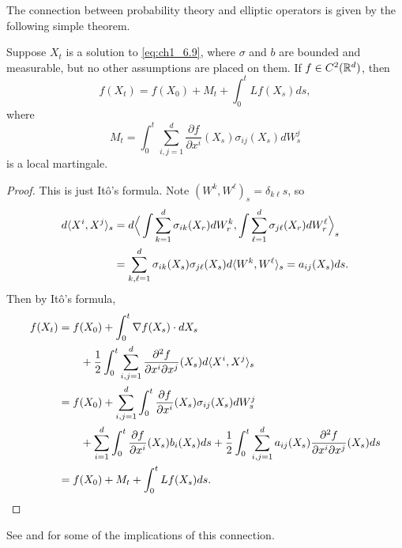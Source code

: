 The connection between probability theory and elliptic operators is given by the following simple theorem.

\begin{theorem}\label{thm:ch1_6.3}
Suppose $X_t$ is a solution to \eqref{eq:ch1_6.9}, where $\sigma$ and $b$ are bounded and measurable, but no other assumptions are placed on them. If $f \in C^2(\mathbb{R}^d)$, then
\begin{equation}\label{eq:ch1_6.11}
    f(X_t) = f(X_0) + M_t + \int_0^t Lf(X_s)ds,
\end{equation}
where
\begin{equation}\label{eq:ch1_6.12}
    M_t = \int_0^t \sum_{i,j=1}^d \frac{\partial f}{\partial x^i}(X_s)\sigma_{ij}(X_s)dW_s^j
\end{equation}
is a local martingale.
\end{theorem}

\begin{proof}
This is just It\^o's formula. Note $(W^k,W^\ell)_s = \delta_{k\ell}s$, so
\begin{align*}
    d\langle X^i,X^j \rangle_s &= d\Big\langle \int \sum_{k=1}^d \sigma_{ik}(X_r)dW_r^k, \int \sum_{\ell=1}^d \sigma_{j\ell}(X_r)dW_r^\ell \Big\rangle_s \\
    &= \sum_{k,\ell=1}^d \sigma_{ik}(X_s)\sigma_{j\ell}(X_s)d\langle W^k,W^\ell \rangle_s = a_{ij}(X_s)ds.
\end{align*}
Then by It\^o's formula,
\begin{align*}
    f(X_t) &= f(X_0) + \int_0^t \nabla f(X_s) \cdot dX_s \\
    &\qquad + \frac{1}{2}\int_0^t \sum_{i,j=1}^d \frac{\partial^2 f}{\partial x^i\partial x^j}(X_s)d\langle X^i,X^j \rangle_s \\
    &=f(X_0)+\sum_{i,j=1}^d \int_0^t \frac{\partial f}{\partial x^i}(X_s)\sigma_{ij}(X_s)dW_s^j \\
    &\qquad + \sum_{i=1}^d \int_0^t \frac{\partial f}{\partial x^i}(X_s)b_i(X_s)ds + \frac{1}{2}\int_0^t \sum_{i,j=1}^d a_{ij}(X_s) \frac{\partial^2 f}{\partial x^i\partial x^j}(X_s)ds \\
    &=f(X_0) + M_t + \int_0^t Lf(X_s)ds.
\end{align*}
\end{proof}

See \cite{StroockVaradhan1979} and \cite{IkedaWatanabe1981} for some of the implications of this connection.




